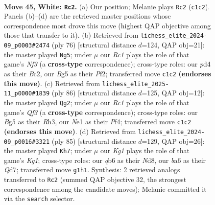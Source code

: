 \documentclass[11pt]{article}
\begin{document}
\clearpage

\begin{figure}[p]\centering
\begin{subfigure}{0.46\textwidth}\centering
\resizebox{\linewidth}{!}{%
\newchessgame
\chessboard[
  setfen={5k2/r6p/bq2p3/p2pbpBQ/P1np3P/8/5P2/RNR1N1K1 w - - 10 45},
  showmover=false,
  pgfstyle=straightmove, color=movearrow, markmove={c1-c2}
]}
\caption{}
\end{subfigure}\hfill
\begin{subfigure}{0.46\textwidth}\centering
\resizebox{\linewidth}{!}{%
\newchessgame
\chessboard[
  setfen={2r1bbk1/3q3p/p3pBp1/4P3/7Q/2p2N1R/P1Bn1PP1/6K1 w - - 4 39},
  showmover=false,
  pgfstyle=straightmove, color=movearrow, markmove={f3-g5}
]}
\caption{}
\end{subfigure}
\\[4pt]
\begin{subfigure}{0.46\textwidth}\centering
\resizebox{\linewidth}{!}{%
\newchessgame
\chessboard[
  setfen={6k1/r6p/2n1q1p1/5pB1/2ppnP2/5Q1R/2P4P/5NK1 w - - 6 44},
  showmover=false,
  pgfstyle=straightmove, color=movearrow, markmove={f3-g2}
]}
\caption{}
\end{subfigure}\hfill
\begin{subfigure}{0.46\textwidth}\centering
\resizebox{\linewidth}{!}{%
\newchessgame
\chessboard[
  setfen={3n2k1/p2qbrp1/P5Np/2p1Bp1P/5P2/5PK1/4Q3/1R6 b - - 2 43},
  showmover=false,
  pgfstyle=straightmove, color=movearrow, markmove={g8-h7}
]}
\caption{}
\end{subfigure}
\caption{\textbf{Move 45, White: \texttt{Rc2}.} (a) Our position; Melanie plays \texttt{Rc2} (\texttt{c1c2}). Panels (b)--(d) are the retrieved master positions whose correspondence most drove this move (highest QAP objective among those that transfer to it). (b) Retrieved from \texttt{lichess\_elite\_2024-09\_p0003\#2474} (ply 76) [structural distance $d$=124, QAP obj=21]: the master played \texttt{Ng5}; under $\mu$ our \emph{Rc1} plays the role of that game's \emph{Nf3} (a \textbf{cross-type} correspondence); cross-type roles: our \emph{p}d4 as their \emph{B}c2, our \emph{B}g5 as their \emph{P}f2; transferred move \texttt{c1c2} \textbf{(endorses this move)}. (c) Retrieved from \texttt{lichess\_elite\_2025-11\_p0000\#1839} (ply 86) [structural distance $d$=125, QAP obj=12]: the master played \texttt{Qg2}; under $\mu$ our \emph{Rc1} plays the role of that game's \emph{Qf3} (a \textbf{cross-type} correspondence); cross-type roles: our \emph{B}g5 as their \emph{R}h3, our \emph{N}e1 as their \emph{P}f4; transferred move \texttt{c1c2} \textbf{(endorses this move)}. (d) Retrieved from \texttt{lichess\_elite\_2024-09\_p0016\#3321} (ply 85) [structural distance $d$=129, QAP obj=26]: the master played \texttt{Kh7}; under $\mu$ our \emph{Kg1} plays the role of that game's \emph{Kg1}; cross-type roles: our \emph{q}b6 as their \emph{N}d8, our \emph{b}a6 as their \emph{Q}d7; transferred move \texttt{g1h1}. Synthesis: 2 retrieved analogs transferred to \texttt{Rc2} (summed QAP objective 32, the strongest correspondence among the candidate moves); Melanie committed it via the \texttt{search} selector.}
\label{fig:thought-m88}
\end{figure}
\end{document}
